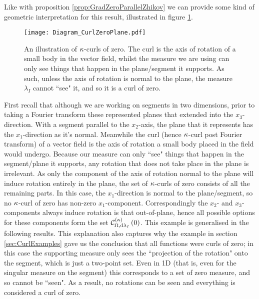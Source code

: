 Like with proposition \ref{prop:GradZeroParallelZhikov} we can provide some kind of geometric interpretation for this result, illustrated in figure \ref{fig:CurlZeroInterp}.
\begin{figure}[t]
	\centering
	\texttt{[image: Diagram\_CurlZeroPlane.pdf]}
	\caption{\label{fig:CurlZeroInterp} An illustration of $\kappa$-curls of zero. The curl is the axis of rotation of a small body in the vector field, whilst the measure we are using can only see things that happen in the plane/segment it supports. As such, unless the axis of rotation is normal to the plane, the measure $\lambda_I$ cannot ``see" it, and so it is a curl of zero.}
\end{figure}
First recall that although we are working on segments in two dimensions, prior to taking a Fourier transform these represented planes that extended into the $x_3$-direction.
With a segment parallel to the $x_2$-axis, the plane that it represents has the $x_1$-direction as it's normal.
Meanwhile the curl (hence $\kappa$-curl post Fourier transform) of a vector field is the axis of rotation a small body placed in the field would undergo.
Because our measure can only ``see" things that happen in the segment/plane it supports, any rotation that does not take place in the plane is irrelevant.
As only the component of the axis of rotation normal to the plane will induce rotation entirely in the plane, the set of $\kappa$-curls of zero consists of all the remaining parts.
In this case, the $x_1$-direction is normal to the plane/segment, so no $\kappa$-curl of zero has non-zero $x_1$-component.
Correspondingly the $x_2$- and $x_3$-components always induce rotation is that out-of-plane, hence all possible options for these components form the set $\mathcal{C}_{ \Omega, \mathrm{d}\lambda_I}^{(\kappa)}\left( 0 \right)$.
This example is generalised in the following results. 
This explanation also captures why the example in section \ref{sec:CurlExamples} gave us the conclusion that all functions were curls of zero; in this case the supporting measure only sees the ``projection of the rotation" onto the segment, which is just a two-point set.
Even in 1D (that is, even for the singular measure on the segment) this corresponds to a set of zero measure, and so cannot be ``seen".
As a result, no rotations can be seen and everything is considered a curl of zero. \newline

